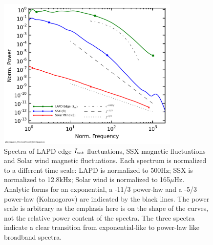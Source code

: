 \documentclass[aps,pre,twocolumn,secnumarabic,nobalancelastpage,amsmath,amssymb,
nofootinbib]{revtex4-1}
\begin{document}
\begin{figure}[!htbp]
\centerline{
\includegraphics[width=9cm]{spectra.png}}
\caption{\label{spectra} Spectra of LAPD edge $I_{\rm sat}$ fluctuations, SSX magnetic fluctuations and Solar wind magnetic fluctuations. Each spectrum is normalized to a different time scale: LAPD is normalized to 500Hz; SSX is normalized to 12.8kHz; Solar wind is normalized to 165$\mu$Hz. Analytic forms for an exponential, a -11/3 power-law and a -5/3 power-law (Kolmogorov) are indicated by the black lines. The power scale is arbitrary as the emphasis here is on the shape of the curves, not the relative power content of the spectra. The three spectra indicate a clear transition from exponential-like to power-law like broadband spectra.}
\end{figure}
\end{document}

